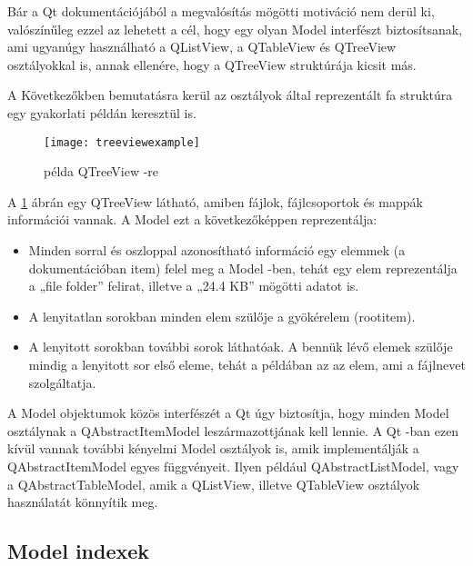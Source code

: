 Bár a Qt dokumentációjából a megvalósítás mögötti motiváció nem derül ki, 
valószínűleg ezzel az lehetett a cél, 
hogy egy olyan Model interfészt biztosítsanak, 
ami ugyanúgy használható 
a {\ttfamily QListView}, a {\ttfamily QTableView} 
és {\ttfamily QTreeView} osztályokkal is, annak ellenére, 
hogy a {\ttfamily QTreeView} struktúrája kicsit más.

A Következőkben bemutatásra kerül az osztályok által reprezentált fa struktúra 
egy gyakorlati példán keresztül is.
\begin{figure}[h]
\centering
\texttt{[image: treeviewexample]}
\caption{példa QTreeView -re}
\label{fig:x treeviewexample}
\end{figure}
A \ref{fig:x treeviewexample} ábrán egy {\ttfamily QTreeView} látható, 
amiben fájlok, fájlcsoportok és mappák információi vannak. 
A Model ezt a következőképpen reprezentálja:
\begin{itemize}
\item
Minden sorral és oszloppal azonosítható információ 
egy elemmek (a dokumentációban item) felel meg a Model -ben,
tehát egy elem reprezentálja a „file folder” felirat, 
illetve a „24.4 KB” mögötti adatot is.
\item
A lenyitatlan sorokban minden elem szülője a gyökérelem (rootitem).
\item
A lenyitott sorokban további sorok láthatóak. 
A bennük lévő elemek szülője mindig a lenyitott sor első eleme, 
tehát a példában az az elem, ami a fájlnevet szolgáltatja.
\end{itemize}

A Model objektumok közös interfészét a Qt úgy biztosítja, 
hogy minden Model osztálynak a 
{\ttfamily QAbstractItemModel} leszármazottjának kell lennie. 
A Qt -ban ezen kívül vannak további kényelmi Model osztályok is, 
amik implementálják a {\ttfamily QAbstractItemModel} egyes függvényeit. 
Ilyen például {\ttfamily QAbstractListModel}, 
vagy a {\ttfamily QAbstractTableModel}, 
amik a {\ttfamily QListView}, 
illetve {\ttfamily QTableView} osztályok használatát könnyítik meg. 

\subsection{Model indexek}

